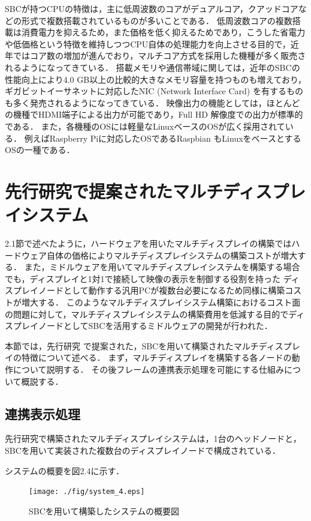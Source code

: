 SBCが持つCPUの特徴は，主に低周波数のコアがデュアルコア，クアッドコアなどの形式で複数搭載されているものが多いことである．
低周波数コアの複数搭載は消費電力を抑えるため，また価格を低く抑えるためであり，こうした省電力や低価格という特徴を維持しつつCPU自体の処理能力を向上させる目的で，近年ではコア数の増加が進んでおり，マルチコア方式を採用した機種が多く販売されるようになってきている．
搭載メモリや通信帯域に関しては，近年のSBCの性能向上により4.0 GB以上の比較的大きなメモリ容量を持つものも増えており，ギガビットイーサネットに対応したNIC (Network Interface Card) を有するものも多く発売されるようになってきている．
映像出力の機能としては，ほとんどの機種でHDMI端子による出力が可能であり，Full HD 解像度での出力が標準的である．
また，各機種のOSには軽量なLinuxベースのOSが広く採用されている．
例えばRaspberry Piに対応したOSであるRaspbian \cite{raspbian}もLinuxをベースとするOSの一種である．



\section{先行研究で提案されたマルチディスプレイシステム}

2.1節で述べたように，ハードウェアを用いたマルチディスプレイの構築ではハードウェア自体の価格によりマルチディスプレイシステムの構築コストが増大する．
また，ミドルウェアを用いてマルチディスプレイシステムを構築する場合でも，ディスプレイと1対1で接続して映像の表示を制御する役割を持った
ディスプレイノードとして動作する汎用PCが複数台必要になるため同様に構築コストが増大する．
このようなマルチディスプレイシステム構築におけるコスト面の問題に対して，マルチディスプレイシステムの構築費用を低減する目的でディスプレイノードとしてSBCを活用するミドルウェアの開発が行われた．

本節では，先行研究 \cite{Ishida}で提案された，SBCを用いて構築されたマルチディスプレイの特徴について述べる．
まず，マルチディスプレイを構築する各ノードの動作について説明する．
その後フレームの連携表示処理を可能にする仕組みについて概説する．

\subsection*{連携表示処理}

先行研究で構築されたマルチディスプレイシステムは，1台のヘッドノードと，SBCを用いて実装された複数台のディスプレイノードで構成されている．

システムの概要を図2.4に示す．

\begin{figure}[H]
  \hspace*{\fill}
  \texttt{[image: ./fig/system\_4.eps]}
  \hspace*{\fill}
  \label{fig_2.4}
  \caption{SBCを用いて構築したシステムの概要図}
 \end{figure}

